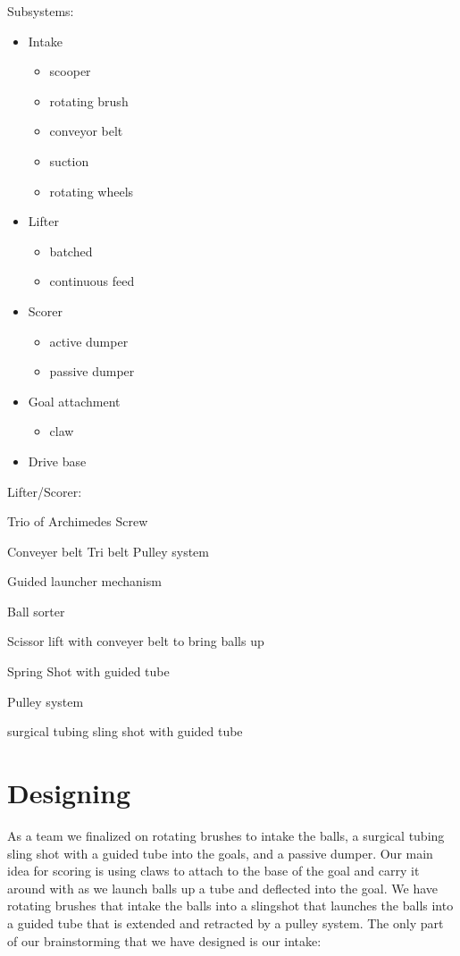 Subsystems:
\begin{itemize}
 \item Intake
 \begin{itemize}
  \item scooper
  \item rotating brush
  \item conveyor belt
  \item suction
  \item rotating wheels
 \end{itemize}
 \item Lifter
 \begin{itemize}
  \item batched
  \item continuous feed
 \end{itemize}
 \item Scorer
 \begin{itemize}
  \item active dumper
  \item passive dumper
 \end{itemize}
 \item Goal attachment
 \begin{itemize}
  \item claw
 \end{itemize}
 \item Drive base
\end{itemize}

Lifter/Scorer:

Trio of Archimedes Screw

Conveyer belt Tri belt Pulley system

Guided launcher mechanism

Ball sorter

Scissor lift with conveyer belt to bring balls up

Spring Shot with guided tube

Pulley system

surgical tubing sling shot with guided tube

\section*{Designing}
As a team we finalized on rotating brushes to intake the balls,
a surgical tubing sling shot with a guided tube into the goals,
and a passive dumper. Our main idea for scoring is using claws to attach
to the base of the goal and carry it around with as we launch balls up a tube and
deflected into the goal. We have rotating brushes that intake the balls into a
slingshot that launches the balls into a guided tube that is extended and retracted by
a pulley system. The only part of our brainstorming that we have designed is our intake:

